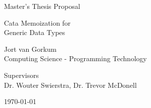 \begin{titlepage}
  \fontsize{12pt}{15pt}\selectfont
  \begin{center}
    \vspace*{4cm}

    Master's Thesis Proposal

    \vspace{0.5cm}

    {
      \fontsize{20.74pt}{20.74pt}\selectfont
      \parbox[]{13cm} {
        \centering
        Cata Memoization for \\ Generic Data Types
      }
    }
      
    \vspace{1.25cm}
    
    Jort van Gorkum\\
    Computing Science - Programming Technology\\
    
    \vspace{1.25cm}
    
    Supervisors \\
    Dr. Wouter Swierstra, Dr. Trevor McDonell\\
    
    \vspace{1cm}

    \today
  \end{center}
\end{titlepage}